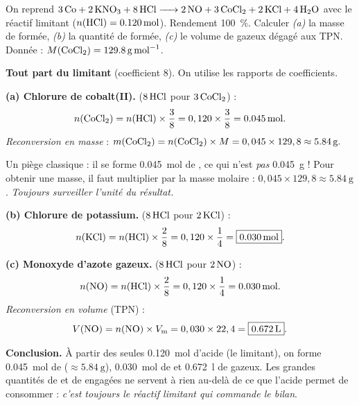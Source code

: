 \documentclass[11pt,a4paper]{article}
\newcommand{\Vm}{V_{\mathrm{m}}}          %
\begin{document}
\begin{exemple}
On reprend $\ce{3 Co + 2 KNO3 + 8 HCl -> 2 NO + 3 CoCl2 + 2 KCl + 4 H2O}$ avec le réactif limitant
 ($n(\ce{HCl})=\SI{0,120}{\mole}$). Rendement \SI{100}{\percent}. Calculer \emph{(a)} la masse
de  formée, \emph{(b)} la quantité de  formée, \emph{(c)} le volume de 
gazeux dégagé aux TPN. Donnée : $M(\ce{CoCl2})=\SI{129,8}{\gram\per\mole}$.

\smallskip
\textbf{Tout part du limitant } (coefficient 8). On utilise les rapports de coefficients.

\textbf{(a) Chlorure de cobalt(II).} ($8\,\ce{HCl}$ pour $3\,\ce{CoCl2}$) :
\[
n(\ce{CoCl2})=n(\ce{HCl})\times\frac{3}{8}=0,120\times\frac{3}{8}=\SI{0,045}{\mole}.
\]
\emph{Reconversion en masse} : $m(\ce{CoCl2})=n(\ce{CoCl2})\times M=0,045\times129,8\approx\SI{5,84}{\gram}.$

\begin{attention}
Un piège classique : il se forme \SI{0,045}{\mole} de , ce qui n'est \emph{pas}
\SI{0,045}{\gram} ! Pour obtenir une masse, il faut multiplier par la masse molaire :
$0,045\times129,8\approx\SI{5,84}{\gram}$. \emph{Toujours surveiller l'unité du résultat.}
\end{attention}

\textbf{(b) Chlorure de potassium.} ($8\,\ce{HCl}$ pour $2\,\ce{KCl}$) :
\[
n(\ce{KCl})=n(\ce{HCl})\times\frac{2}{8}=0,120\times\frac{1}{4}=\boxed{\SI{0,030}{\mole}}.
\]

\textbf{(c) Monoxyde d'azote gazeux.} ($8\,\ce{HCl}$ pour $2\,\ce{NO}$) :
\[
n(\ce{NO})=n(\ce{HCl})\times\frac{2}{8}=0,120\times\frac{1}{4}=\SI{0,030}{\mole}.
\]
\emph{Reconversion en volume} (TPN) :
\[
V(\ce{NO})=n(\ce{NO})\times\Vm=0,030\times22,4=\boxed{\SI{0,672}{\litre}}.
\]

\textbf{Conclusion.} À partir des seules \SI{0,120}{\mole} d'acide (le limitant), on forme
\SI{0,045}{\mole} de  ($\approx\SI{5,84}{\gram}$), \SI{0,030}{\mole} de  et
\SI{0,672}{\litre} de  gazeux. Les grandes quantités de  et de  engagées ne
servent à rien au-delà de ce que l'acide permet de consommer : \emph{c'est toujours le réactif
limitant qui commande le bilan}.
\end{exemple}
\end{document}
